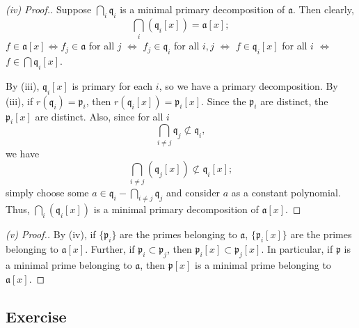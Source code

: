 \begin{proof}[(iv) Proof.]
Suppose $\bigcap_i \mathfrak{q}_i$ is a minimal primary decomposition of $\mathfrak{a}$. Then clearly,
$$\bigcap_i (\mathfrak{q}_i[x]) = \mathfrak{a}[x];$$
$f \in \mathfrak{a}[x] \iff f_j \in \mathfrak{a}$ for all $j$ $\iff$ $f_j \in \mathfrak{q}_i$ for all $i, j$ $\iff$ $f \in\mathfrak{q}_i[x]$ for all $i$ $\iff$ $f \in \bigcap \mathfrak{q}_i[x]$.

By (iii), $\mathfrak{q}_i[x]$ is primary for each $i$, so we have a primary decomposition. By (iii), if $r(\mathfrak{q}_i) = \mathfrak{p}_i$, then $r(\mathfrak{q}_i[x]) = \mathfrak{p}_i[x]$. Since the $\mathfrak{p}_i$
are distinct, the $\mathfrak{p}_i[x]$ are distinct. Also, since for all $i$
$$\bigcap_{i\neq j}\mathfrak{q}_j \not\subset \mathfrak{q}_i,$$
we have
$$\bigcap_{i\neq j}(\mathfrak{q}_j[x]) \not\subset \mathfrak{q}_i[x];$$
simply choose some $a \in \mathfrak{q}_i - \bigcap_{i\neq j}\mathfrak{q}_j$ and consider $a$ as a constant polynomial. Thus, $\bigcap_i (\mathfrak{q}_i[x])$ is a minimal primary decomposition of $\mathfrak{a}[x]$.
\end{proof}

\begin{proof}[(v) Proof.]
By (iv), if $\{\mathfrak{p}_i\}$ are the primes belonging to $\mathfrak{a}$, $\{\mathfrak{p}_i[x]\}$ are the primes belonging to $\mathfrak{a}[x]$. Further, if $\mathfrak{p}_i \subset \mathfrak{p}_j$, then 
$\mathfrak{p}_i[x] \subset \mathfrak{p}_j[x]$. In particular, if $\mathfrak{p}$ is a minimal prime belonging to $\mathfrak{a}$, then $\mathfrak{p}[x]$ is a minimal prime belonging to $\mathfrak{a}[x]$.
\end{proof}

\subsection{Exercise}\label{4.8}

